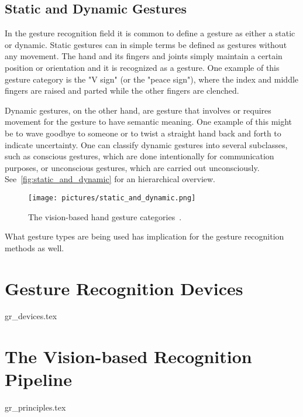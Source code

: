 \subsection{Static and Dynamic Gestures}
\label{sec:gesture_classes}
In the gesture recognition field it is common to define a gesture as either a static or dynamic. Static gestures can in simple terms be defined as gestures
without any movement. The hand and its fingers and joints simply maintain a certain position or orientation and it is recognized as a gesture. One example 
of this gesture category is the "V sign" (or the "peace sign"), where the index and middle fingers are raised and parted while the other fingers are clenched.

Dynamic gestures, on the other hand, are gesture that involves or requires movement for the gesture to have semantic meaning. One example of this
might be to wave goodbye to someone or to twist a straight hand back and forth to indicate uncertainty. One can classify dynamic gestures into several 
subclasses, such as conscious gestures, which are done intentionally for communication purposes, or unconscious gestures, which are carried out unconsciously.
See~\vref{fig:static_and_dynamic} for an hierarchical overview.

\begin{figure}%
	\texttt{[image: pictures/static\_and\_dynamic.png]}
	\caption[The vision-based hand gesture categories]{The vision-based hand gesture categories~\citep{Kanniche2009}.}
	\label{fig:static_and_dynamic}
\end{figure} 


What gesture types are being used has implication for the gesture recognition methods as well. 

\section{Gesture Recognition Devices}
\label{sec:gr_devices}
{gr_devices.tex}


\section{The Vision-based Recognition Pipeline}
\label{sec:gr_principles}
{gr_principles.tex}



